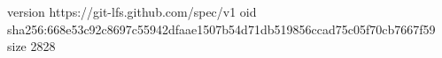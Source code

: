 version https://git-lfs.github.com/spec/v1
oid sha256:668e53c92c8697c55942dfaae1507b54d71db519856ccad75c05f70cb7667f59
size 2828
